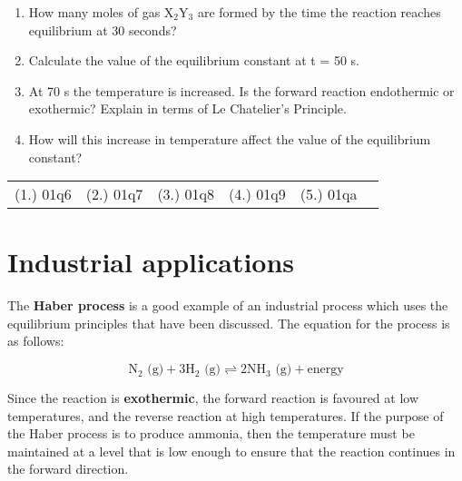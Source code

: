 {\begin{enumerate}
{	\begin{enumerate}
	\item{How many moles of gas X$_{2}$Y$_{3}$ are formed by the time the reaction reaches equilibrium at 30 seconds?}
	\item{Calculate the value of the equilibrium constant at t = 50 s.}
	\item{At 70 s the temperature is increased. Is the forward reaction endothermic or exothermic? Explain in terms of Le Chatelier's Principle.}
	\item{How will this increase in temperature affect the value of the equilibrium constant?}
	\end{enumerate}
}

\end{enumerate}

\par \practiceinfo
\par \begin{tabular}[h]{cccccc}
(1.)	01q6	&
(2.)	01q7	&
(3.)	01q8	&
(4.)	01q9	&
(5.)	01qa	&
\end{tabular}


}







\section{Industrial applications}
\label{sec:reactionrates:industrial}

The \textbf{Haber process} is a good example of an industrial process which uses the equilibrium principles that have been discussed. The equation for the process is as follows:

\begin{equation*}
\text{N}_{2}\text{ (g)} + 3\text{H}_{2}\text{ (g)} \rightleftharpoons 2\text{NH}_{3}\text{ (g)} + \text{energy} 
\end{equation*}

Since the reaction is \textbf{exothermic}, the forward reaction is favoured at low temperatures, and the reverse reaction at high temperatures. If the purpose of the Haber process is to produce ammonia, then the temperature must be maintained at a level that is low enough to ensure that the reaction continues in the forward direction.\\

